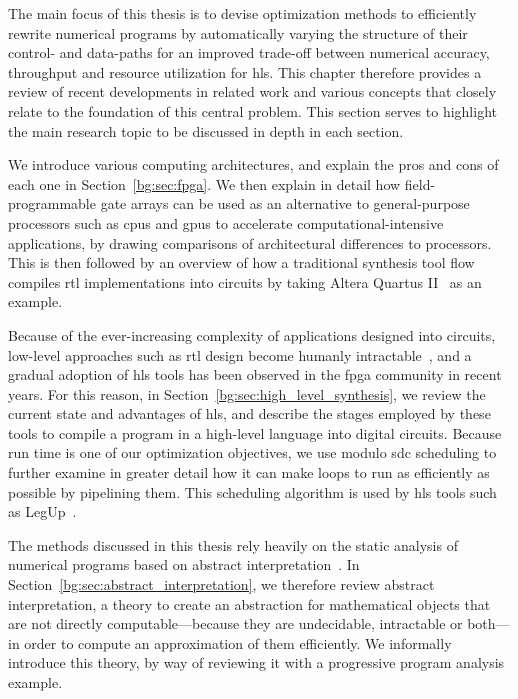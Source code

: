 The main focus of this thesis is to devise optimization methods to efficiently
rewrite numerical programs by automatically varying the structure of their
control- and data-paths for an improved trade-off between numerical accuracy,
throughput and resource utilization for \gls{hls}\@.  This chapter therefore
provides a review of recent developments in related work and various concepts
that closely relate to the foundation of this central problem.  This section
serves to highlight the main research topic to be discussed in depth in each
section.

We introduce various computing architectures, and explain the pros and
cons of each one in Section~\ref{bg:sec:fpga}.  We then explain in detail
how field-programmable gate arrays can be used as an alternative to
general-purpose processors such as \glspl{cpu} and \glspl{gpu} to accelerate
computational-intensive applications, by drawing comparisons of architectural
differences to processors.  This is then followed by an overview of how a
traditional synthesis tool flow compiles \gls{rtl} implementations into
circuits by taking Altera Quartus II~\cite{quartus} as an example.

Because of the ever-increasing complexity of applications designed into
circuits, low-level approaches such as \gls{rtl} design become humanly
intractable~\cite{gajski}, and a gradual adoption of \gls{hls} tools has been
observed in the \gls{fpga} community in recent years.  For this reason, in
Section~\ref{bg:sec:high_level_synthesis}, we review the current state and
advantages of \gls{hls}, and describe the stages employed by these tools to
compile a program in a high-level language into digital circuits.  Because
run time is one of our optimization objectives, we use modulo \gls{sdc}
scheduling to further examine in greater detail how it can make loops to run as
efficiently as possible by pipelining them.  This scheduling algorithm is used
by \gls{hls} tools such as LegUp~\cite{legup}.

The methods discussed in this thesis rely heavily on the static analysis of
numerical programs based on abstract interpretation~\cite{cousot77}.  In
Section~\ref{bg:sec:abstract_interpretation}, we therefore review abstract
interpretation, a theory to create an abstraction for mathematical objects that
are not directly computable---because they are undecidable, intractable or
both---in order to compute an approximation of them efficiently.  We informally
introduce this theory, by way of reviewing it with a progressive program
analysis example.

